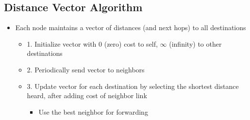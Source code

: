 \documentclass[12pt]{ctexart}   %
\begin{document}
	\subsection{Distance Vector Algorithm}
	\begin{itemize}
		\item Each node maintains a vector of distances (and next hops) to all destinations
		\begin{itemize}
			\item {\color{blue} 1.} Initialize vector with 0 (zero) cost to self, $\infty$ (infinity) to other destinations
			\item {\color{blue} 2.} Periodically send vector to neighbors
			\item {\color{blue} 3.} Update vector for each destination by selecting the shortest distance heard, after adding cost of neighbor link
			\begin{itemize}
				\item Use the best neighbor for forwarding
			\end{itemize}			  
		\end{itemize}
	\end{itemize}
	
\end{document}
